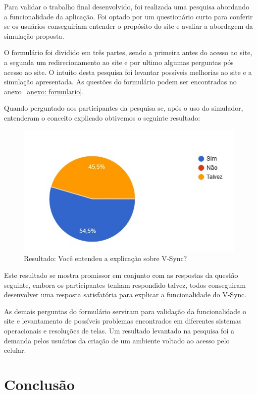 \documentclass[tcc,capa]{texufpel}
\begin{document}
Para validar o trabalho final desenvolvido, foi realizada uma pesquisa abordando a funcionalidade da aplicação. Foi optado por um questionário curto para conferir se os usuários conseguiriam entender o propósito do site e avaliar a abordagem da simulação proposta. 

O formulário foi dividido em três partes, sendo a primeira antes do acesso ao site, a segunda um redirecionamento ao site e por ultimo algumas perguntas pós acesso ao site. O intuito desta pesquisa foi levantar possíveis melhorias ao site e a simulação apresentada. As questões do formulário podem ser encontradas no anexo~\ref{anexo: formulario}.

Quando perguntado aos participantes da pesquisa se, após o uso do simulador, entenderam o conceito explicado obtivemos o seguinte resultado: 

\begin{figure}[htbp]
  \centering \includegraphics[scale=.3]{Graficos/resultado_compreendeu_simulacao.jpeg}
  \caption{Resultado: Você entendeu a explicação sobre V-Sync?}
  \label{resultado_compreendeu_simulacao}
\end{figure}

Este resultado se mostra promissor em conjunto com as respostas da questão seguinte, embora os participantes tenham respondido talvez, todos conseguiram desenvolver uma resposta satisfatória para explicar a funcionalidade do V-Sync.

As demais perguntas do formulário serviram para validação da funcionalidade o site e levantamento de possíveis problemas encontrados em diferentes sistemas operacionais e resoluções de telas. Um resultado levantado na pesquisa foi a demanda pelos usuários da criação de um ambiente voltado ao acesso pelo celular.

\chapter{Conclusão}
\label{cap: conclusao}
\end{document}
